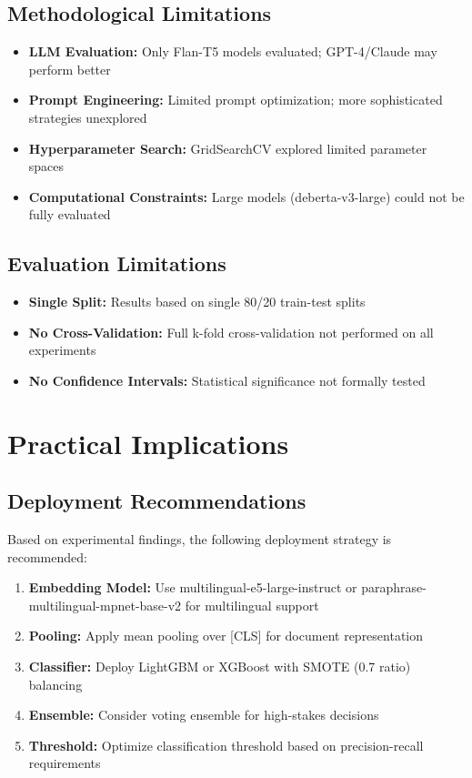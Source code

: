\documentclass[11pt, titlepage, bibliography=totoc]{scrreprt}
\begin{document}
\subsection{Methodological Limitations}
\begin{itemize}
    \item \textbf{LLM Evaluation:} Only Flan-T5 models evaluated; GPT-4/Claude may perform better
    \item \textbf{Prompt Engineering:} Limited prompt optimization; more sophisticated strategies unexplored
    \item \textbf{Hyperparameter Search:} GridSearchCV explored limited parameter spaces
    \item \textbf{Computational Constraints:} Large models (deberta-v3-large) could not be fully evaluated
\end{itemize}

\subsection{Evaluation Limitations}
\begin{itemize}
    \item \textbf{Single Split:} Results based on single 80/20 train-test splits
    \item \textbf{No Cross-Validation:} Full k-fold cross-validation not performed on all experiments
    \item \textbf{No Confidence Intervals:} Statistical significance not formally tested
\end{itemize}

\section{Practical Implications}

\subsection{Deployment Recommendations}
Based on experimental findings, the following deployment strategy is recommended:

\begin{enumerate}
    \item \textbf{Embedding Model:} Use multilingual-e5-large-instruct or paraphrase-multilingual-mpnet-base-v2 for multilingual support
    \item \textbf{Pooling:} Apply mean pooling over [CLS] for document representation
    \item \textbf{Classifier:} Deploy LightGBM or XGBoost with SMOTE (0.7 ratio) balancing
    \item \textbf{Ensemble:} Consider voting ensemble for high-stakes decisions
    \item \textbf{Threshold:} Optimize classification threshold based on precision-recall requirements
\end{enumerate}
\end{document}

